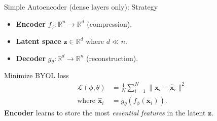 \documentclass{beamer}
\begin{document}
\begin{frame}{Simple Autoencoder (dense layers only): Strategy}
  \begin{itemize}
  \item \textbf{Encoder} $f_\phi: \mathbb{R}^n \to \mathbb{R}^d$ (compression).
  \vspace{0.3cm}
  \item \textbf{Latent space} $\mathbf{z} \in \mathbb{R}^d$ where $d \ll n$.
  \vspace{0.3cm}
  \item \textbf{Decoder} $g_\theta: \mathbb{R}^d \to \mathbb{R}^n$ (reconstruction).
  \end{itemize}
  \vspace{0.5cm}
  Minimize BYOL loss
  \begin{align*}
    \mathcal{L}(\phi, \theta) &= \frac{1}{N} \sum_{i=1}^N \|\mathbf{x}_i - \hat{\mathbf{x}}_i\|^2\\
    \text{where } \hat{\mathbf{x}}_i &= g_\theta(f_\phi(\mathbf{x}_i)).
  \end{align*}
  \vspace{0.3cm}\pause
  \alert{\textbf{Encoder}} learns to store the most
  \emph{essential features} in the latent $\mathbf{z}$.

\end{frame}
\end{document}

